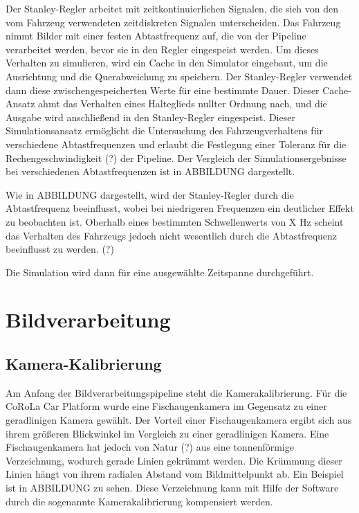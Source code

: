 \documentclass[arbeit=studie,oneside,BCOR=12mm]{ArbeitRST}
\begin{document}
Der Stanley-Regler arbeitet mit zeitkontinuierlichen Signalen, die sich von den
vom Fahrzeug verwendeten zeitdiskreten Signalen unterscheiden. Das Fahrzeug
nimmt Bilder mit einer festen Abtastfrequenz auf, die von der Pipeline
verarbeitet werden, bevor sie in den Regler eingespeist werden. Um dieses
Verhalten zu simulieren, wird ein Cache in den Simulator eingebaut, um die
Ausrichtung und die Querabweichung zu speichern. Der Stanley-Regler verwendet
dann diese zwischengespeicherten Werte für eine bestimmte Dauer. Dieser
Cache-Ansatz ahmt das Verhalten eines Halteglieds nullter Ordnung nach, und die
Ausgabe wird anschließend in den Stanley-Regler eingespeist. Dieser
Simulationsansatz ermöglicht die Untersuchung des Fahrzeugverhaltens für
verschiedene Abtastfrequenzen und erlaubt die Festlegung einer Toleranz für die
Rechengeschwindigkeit (?) der Pipeline. Der Vergleich der Simulationsergebnisse bei
verschiedenen Abtastfrequenzen ist in ABBILDUNG dargestellt.

Wie in ABBILDUNG dargestellt, wird der Stanley-Regler durch die Abtastfrequenz
beeinflusst, wobei bei niedrigeren Frequenzen ein deutlicher Effekt zu
beobachten ist. Oberhalb eines bestimmten Schwellenwerts von X Hz scheint das
Verhalten des Fahrzeugs jedoch nicht wesentlich durch die Abtastfrequenz
beeinflusst zu werden. (?)

Die Simulation wird dann für eine ausgewählte Zeitspanne durchgeführt. 



\chapter{Bildverarbeitung}
\section{Kamera-Kalibrierung}

Am Anfang der Bildverarbeitungspipeline steht die Kamerakalibrierung. Für die
CoRoLa Car Platform wurde eine Fischaugenkamera im Gegensatz zu einer
geradlinigen Kamera gewählt. Der Vorteil einer Fischaugenkamera ergibt sich aus
ihrem größeren Blickwinkel im Vergleich zu einer geradlinigen Kamera. Eine
Fischaugenkamera hat jedoch von Natur (?) aus eine tonnenförmige Verzeichnung,
wodurch gerade Linien gekrümmt werden. Die Krümmung dieser Linien hängt von
ihrem radialen Abstand vom Bildmittelpunkt ab. Ein Beispiel ist in ABBILDUNG zu
sehen. Diese Verzeichnung kann mit Hilfe der Software durch die sogenannte
Kamerakalibrierung kompensiert werden. 
\end{document}
